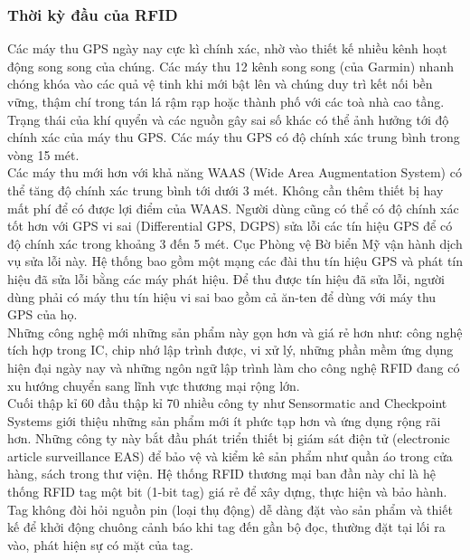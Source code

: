 \subsubsection{Thời kỳ đầu của RFID}
Các máy thu GPS ngày nay cực kì chính xác, nhờ vào thiết kế nhiều kênh hoạt động song song của chúng. Các máy thu 12 kênh song song (của Garmin) nhanh chóng khóa vào các quả vệ tinh khi mới bật lên và chúng duy trì kết nối bền vững, thậm chí trong tán lá rậm rạp hoặc thành phố với các toà nhà cao tầng. Trạng thái của khí quyển và các nguồn gây sai số khác có thể ảnh hưởng tới độ chính xác của máy thu GPS. Các máy thu GPS có độ chính xác trung bình trong vòng 15 mét.\\
Các máy thu mới hơn với khả năng WAAS (Wide Area Augmentation System) có thể tăng độ chính xác trung bình tới dưới 3 mét. Không cần thêm thiết bị hay mất phí để có được lợi điểm của WAAS. Người dùng cũng có thể có độ chính xác tốt hơn với GPS vi sai (Differential GPS, DGPS) sửa lỗi các tín hiệu GPS để có độ chính xác trong khoảng 3 đến 5 mét. Cục Phòng vệ Bờ biển Mỹ vận hành dịch vụ sửa lỗi này. Hệ thống bao gồm một mạng các đài thu tín hiệu GPS và phát tín hiệu đã sửa lỗi bằng các máy phát hiệu. Để thu được tín hiệu đã sửa lỗi, người dùng phải có máy thu tín hiệu vi sai bao gồm cả ăn-ten để dùng với máy thu GPS của họ.
\label{ref{fig1_1}}
\\
Những công nghệ mới những sản phẩm này gọn hơn và giá rẻ hơn như: công nghệ tích hợp trong IC, chip nhớ lập trình được, vi xử lý, những phần mềm ứng dụng hiện đại ngày nay và những ngôn ngữ lập trình làm cho công nghệ RFID đang có xu hướng chuyển sang lĩnh vực thương mại rộng lớn.\\
Cuối thập kỉ 60 đầu thập kỉ 70 nhiều công ty như Sensormatic and Checkpoint Systems giới thiệu những sản phẩm mới ít phức tạp hơn và ứng dụng rộng rãi hơn. Những công ty này bắt đầu phát triển thiết bị giám sát điện tử (electronic article surveillance EAS) để bảo vệ và kiểm kê sản phẩm như quần áo trong cửa hàng, sách trong thư viện. Hệ thống RFID thương mại ban đần này chỉ là hệ thống RFID tag một bit (1-bit tag) giá rẻ để xây dựng, thực hiện và bảo hành. Tag không đòi hỏi nguồn pin (loại thụ động) dễ dàng đặt vào sản phẩm và thiết kế để khởi động chuông cảnh báo khi tag đến gần bộ đọc, thường đặt tại lối ra vào, phát hiện sự có mặt của tag.	
\label{ref{fig1_2}}


